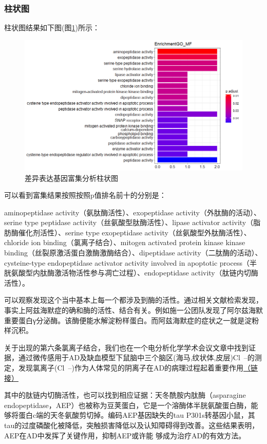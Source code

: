 \documentclass{article}
\begin{document}
\subsubsection{柱状图}
柱状图结果如下图(图\ref{xxxasddf})所示：
\begin{figure}[H]
  \centering
  \includegraphics[scale=0.48]{./picture/Rplot01.png} %
  \caption{差异表达基因富集分析柱状图} %
  \label{xxxasddf} %
\end{figure}
可以看到富集结果按照按照p值排名前十的分别是：\par
aminopeptidase activity（氨肽酶活性）、exopeptidase activity（外肽酶的活动）、serine type peptidase activity（丝氨酸型肽酶活性）、lipase activator activity（脂肪酶催化剂活性）、serine type exopeptidase activity（丝氨酸型外肽酶活性）、chloride ion binding（氯离子结合）、mitogen activated protein kinase kinase binding（丝裂原激活蛋白激酶激酶结合）、dipeptidase activity（二肽酶的活动）、cysteine-type endopeptidase activator activity involved in apoptotic process（半胱氨酸型内肽酶激活物活性参与凋亡过程）、endopeptidase activity（肽链内切酶活性）。\par
可以观察发现这个当中基本上每一个都涉及到酶的活性。通过相关文献检索发现，事实上阿兹海默症的确和酶的活性、结合有关。例如施一公团队发现了阿尔兹海默重要蛋白γ分泌酶\cite{2020Structural}。该酶便能水解淀粉样蛋白。而阿兹海默症的症状之一就是淀粉样沉积。\par
关于出现的第六条氯离子结合，我们也在一个电分析化学学术会议文章中找到证据，通过微传感用于AD及缺血模型下鼠脑中三个脑区(海马,纹状体,皮层)Cl~–的测定，发现氯离子(Cl~–)作为人体常见的阴离子在AD的病理过程起着重要作用\href{http://cpfd.cnki.com.cn/Article/CPFDTOTAL-ZGHY201704002184.htm}{\underline{（链接）}}\par
其中的肽链内切酶活性，也可以找到相应证据：天冬酰胺内肽酶（asparagine endopeptidase，AEP）也被称为豆荚蛋白，它是一个溶酶体半胱氨酸蛋白酶，能够将蛋白c端的天冬氨酸剪切掉。编码AEP基因缺失的tau P301s转基因小鼠，其tau的过度磷酸化被降低，突触损害降低以及认知障碍得到改善。这些结果表明，AEP在AD中发挥了关键作用，抑制AEP或许能 够成为治疗AD的有效方法\cite{2021Pharmacological}。
\end{document}
